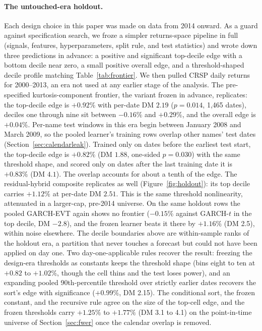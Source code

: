 \documentclass[11pt]{article}
\theoremstyle{remark}
\begin{document}
\paragraph{The untouched-era holdout.} Each design choice in this paper
was made on data from 2014 onward. As a guard against specification
search, we froze a simpler returns-space pipeline in full (signals, features,
hyperparameters, split rule, and test statistics) and wrote down three
predictions in advance: a positive and significant top-decile edge with
a bottom decile near zero, a small positive overall edge, and a
threshold-shaped decile profile matching Table~\ref{tab:frontier}. We then pulled CRSP daily returns for 2000--2013, an
era not used at any earlier stage of the analysis. The pre-specified kurtosis-component frontier, the variant frozen in advance, replicates: the top-decile edge is $+0.92\%$ with per-date DM $2.19$ ($p=0.014$, 1{,}465 dates), deciles one through nine sit between $-0.16\%$ and $+0.29\%$, and the overall edge is $+0.04\%$. Per-name test windows in this era begin between January 2008 and March 2009, so the pooled learner's training rows overlap other names' test dates (Section~\ref{sec:calendarleak}). Trained only on dates before the earliest test start, the top-decile edge is $+0.82\%$ (DM $1.88$, one-sided $p=0.030$) with the same threshold shape, and scored only on dates after the last training date it is $+0.83\%$ (DM $4.1$). The overlap accounts for about a tenth of the edge. The residual-hybrid composite replicates as well (Figure~\ref{fig:holdout}): its top decile carries $+1.12\%$ at per-date DM $2.51$. This is the same threshold nonlinearity, attenuated in a larger-cap, pre-2014 universe. On the same holdout rows the pooled GARCH-EVT again shows no frontier ($-0.15\%$ against GARCH-$t$ in the top decile, DM $-2.8$), and the frozen learner beats it there by $+1.16\%$ (DM 2.5), within noise elsewhere.
The decile boundaries above are within-sample ranks of the holdout era,
a partition that never touches a forecast but could not have been applied
on day one. Two day-one-applicable rules recover the result: freezing the
design-era thresholds as constants keeps the threshold shape (bins eight
to ten at $+0.82$ to $+1.02\%$, though the cell thins and the test loses
power), and an expanding pooled 90th-percentile threshold over strictly
earlier dates recovers the sort's edge with significance ($+0.99\%$, DM
2.15). The conditional sort, the frozen constant, and the recursive rule
agree on the size of the top-cell edge, and the frozen thresholds carry
$+1.25\%$ to $+1.77\%$ (DM 3.1 to 4.1) on the point-in-time universe of Section~\ref{sec:fwer} once the calendar overlap is removed.
\end{document}
